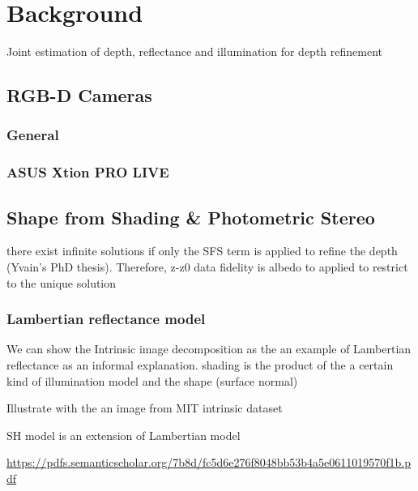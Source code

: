 \chapter{Background} \label{chap:background}
Joint estimation of depth, reflectance and illumination for depth refinement

\section{RGB-D Cameras}

\subsection{General}

\subsection{ASUS Xtion PRO LIVE}


\section{Shape from Shading \& Photometric Stereo}
there exist infinite solutions if only the SFS term is applied to refine the depth (Yvain's PhD thesis). Therefore, z-z0 data fidelity is albedo to applied to restrict to the unique solution 
\subsection{Lambertian reflectance model}
We can show the Intrinsic image decomposition as the an example of Lambertian reflectance as an informal explanation. shading is the product of the a certain kind of illumination model and the shape (surface normal)~\cite{barron2015shape}

Illustrate with the an image from MIT intrinsic dataset~\cite{grosse2009ground}

SH model is an extension of Lambertian model

  \url{https://pdfs.semanticscholar.org/7b8d/fc5d6e276f8048bb53b4a5e0611019570f1b.pdf}
\cite{basri2003lambertian}

